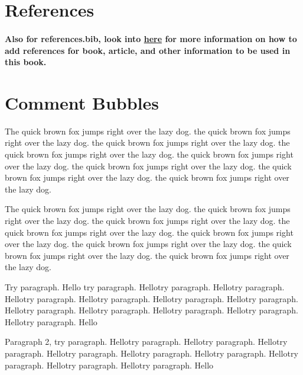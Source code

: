 \section*{References}

\paragraph{
    Also for references.bib, look into \href{https://www.overleaf.com/learn/latex/Bibliography_management_with_bibtex}{here} for more information on how to add references for book, article, and other information to be used in this book.
}

\newpage

\section*{Comment Bubbles}

\colorbox{commentcolor}{\parbox{.25\textwidth}{
    The quick brown fox jumps right over the lazy dog. the quick brown fox jumps right over the lazy dog. the quick brown fox jumps right over the lazy dog. the quick brown fox jumps right over the lazy dog. the quick brown fox jumps right over the lazy dog. the quick brown fox jumps right over the lazy dog. the quick brown fox jumps right over the lazy dog. the quick brown fox jumps right over the lazy dog.
}}

\colorbox{alertcolor}{\parbox{.25\textwidth}{
    The quick brown fox jumps right over the lazy dog. the quick brown fox jumps right over the lazy dog. the quick brown fox jumps right over the lazy dog. the quick brown fox jumps right over the lazy dog. the quick brown fox jumps right over the lazy dog. the quick brown fox jumps right over the lazy dog. the quick brown fox jumps right over the lazy dog. the quick brown fox jumps right over the lazy dog.
}}

\par
Try paragraph. Hello try paragraph. Hellotry paragraph. Hellotry paragraph. Hellotry paragraph. Hellotry paragraph. Hellotry paragraph. Hellotry paragraph. Hellotry paragraph. Hellotry paragraph. Hellotry paragraph. Hellotry paragraph. Hellotry paragraph. Hello
\par
Paragraph 2, try paragraph. Hellotry paragraph. Hellotry paragraph. Hellotry paragraph. Hellotry paragraph. Hellotry paragraph. Hellotry paragraph. Hellotry paragraph. Hellotry paragraph. Hellotry paragraph. Hello